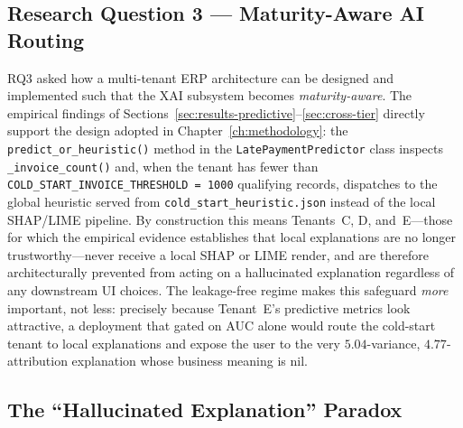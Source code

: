 \subsection{Research Question 3 --- Maturity-Aware AI Routing}
\label{subsec:rq3}

RQ3 asked how a multi-tenant ERP architecture can be designed and
implemented such that the XAI subsystem becomes \emph{maturity-aware}.
The empirical findings of
Sections~\ref{sec:results-predictive}--\ref{sec:cross-tier} directly
support the design adopted in Chapter~\ref{ch:methodology}: the
\texttt{predict\_or\_heuristic()} method in the
\texttt{LatePaymentPredictor} class inspects \texttt{\_invoice\_count()}
and, when the tenant has fewer than
\texttt{COLD\_START\_INVOICE\_THRESHOLD = 1000} qualifying records,
dispatches to the global heuristic served from
\texttt{cold\_start\_heuristic.json} instead of the local SHAP/LIME
pipeline. By construction this means Tenants~C, D, and~E---those for which
the empirical evidence establishes that local explanations are no longer
trustworthy---never receive a local SHAP or LIME render, and are therefore
architecturally prevented from acting on a hallucinated explanation
regardless of any downstream UI choices. The leakage-free regime makes
this safeguard \emph{more} important, not less: precisely because
Tenant~E's predictive metrics look attractive, a deployment that gated on
AUC alone would route the cold-start tenant to local explanations and
expose the user to the very $5.04$-variance, $4.77$-attribution
explanation whose business meaning is nil.

\subsection{The ``Hallucinated Explanation'' Paradox}
\label{subsec:hallucinated-paradox}

